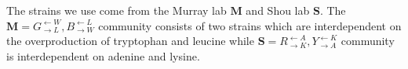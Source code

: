 The strains we use come from the Murray lab $\mathbf{M}$ and Shou lab $\mathbf{S}$.
The $\mathbf{M} = G^{\leftarrow W}_{\rightarrow L},B^{\leftarrow L}_{\rightarrow W} $ community consists of two strains which are interdependent on the overproduction of tryptophan and leucine while $\mathbf{S} = R^{\leftarrow A}_{\rightarrow K},Y^{\leftarrow K}_{\rightarrow A} $ community is interdependent on adenine and lysine.